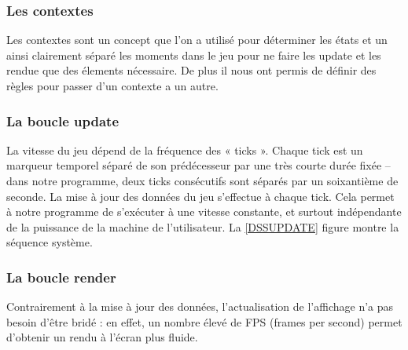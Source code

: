 \subsubsection{Les contextes}

Les contextes sont un concept que l'on a utilisé pour déterminer les états et un ainsi clairement séparé les moments dans le jeu pour ne faire les update et les rendue que des élements nécessaire.
\ml
De plus il nous ont permis de définir des règles pour passer d'un contexte a un autre.


\subsubsection{La boucle update}

La vitesse du jeu dépend de la fréquence des « ticks ». Chaque tick est un marqueur temporel séparé de son prédécesseur par une très courte durée fixée – dans notre programme, deux ticks consécutifs sont séparés par un soixantième de seconde.
\ml\ml
La mise à jour des données du jeu s'effectue à chaque tick. Cela permet à notre programme de s'exécuter à une vitesse constante, et surtout indépendante de la puissance de la machine de l'utilisateur.
\ml\ml
La \ref{DSSUPDATE} figure montre la séquence système.


\subsubsection{La boucle render}

Contrairement à la mise à jour des données, l'actualisation de l'affichage n'a pas besoin d'être bridé : en effet, un nombre élevé de FPS (frames per second) permet d'obtenir un rendu à l'écran plus fluide.